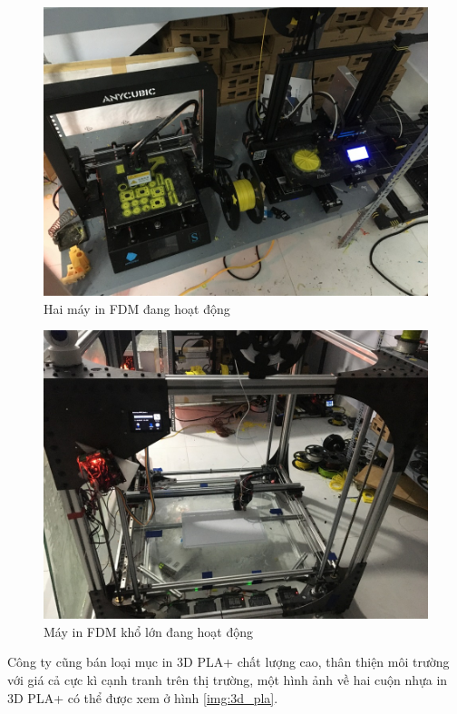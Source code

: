 \begin{figure}[!ht]
\centering
\includegraphics[scale=0.4]{images/img_0365_resized.jpg}
\caption{Hai máy in FDM đang hoạt động}
\label{img:3d_printer1}
\end{figure}

\begin{figure}[!ht]
\centering
\includegraphics[scale=0.4]{images/img_0367_resized.jpg}
\caption{Máy in FDM khổ lớn đang hoạt động}
\label{img:3d_printer2}
\end{figure}

Công ty cũng bán loại mục in 3D PLA+ chất lượng cao, thân thiện môi trường với giá cả cực kì cạnh tranh trên thị trường, một hình ảnh về hai cuộn nhựa in 3D PLA+ có thể được xem ở hình \ref{img:3d_pla}.


